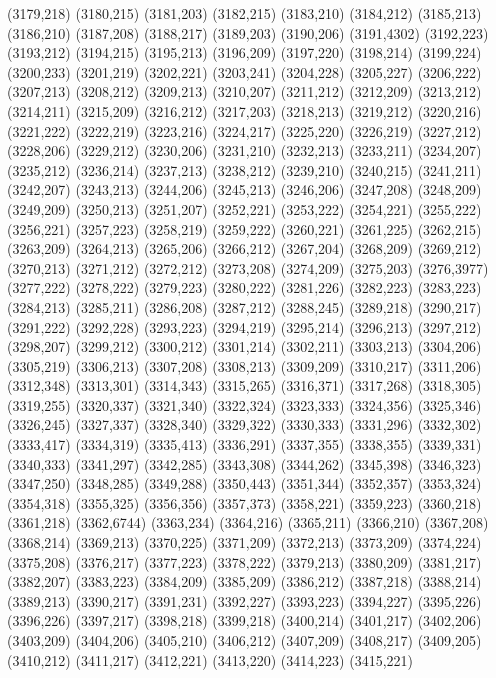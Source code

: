 (3179,218)
(3180,215)
(3181,203)
(3182,215)
(3183,210)
(3184,212)
(3185,213)
(3186,210)
(3187,208)
(3188,217)
(3189,203)
(3190,206)
(3191,4302)
(3192,223)
(3193,212)
(3194,215)
(3195,213)
(3196,209)
(3197,220)
(3198,214)
(3199,224)
(3200,233)
(3201,219)
(3202,221)
(3203,241)
(3204,228)
(3205,227)
(3206,222)
(3207,213)
(3208,212)
(3209,213)
(3210,207)
(3211,212)
(3212,209)
(3213,212)
(3214,211)
(3215,209)
(3216,212)
(3217,203)
(3218,213)
(3219,212)
(3220,216)
(3221,222)
(3222,219)
(3223,216)
(3224,217)
(3225,220)
(3226,219)
(3227,212)
(3228,206)
(3229,212)
(3230,206)
(3231,210)
(3232,213)
(3233,211)
(3234,207)
(3235,212)
(3236,214)
(3237,213)
(3238,212)
(3239,210)
(3240,215)
(3241,211)
(3242,207)
(3243,213)
(3244,206)
(3245,213)
(3246,206)
(3247,208)
(3248,209)
(3249,209)
(3250,213)
(3251,207)
(3252,221)
(3253,222)
(3254,221)
(3255,222)
(3256,221)
(3257,223)
(3258,219)
(3259,222)
(3260,221)
(3261,225)
(3262,215)
(3263,209)
(3264,213)
(3265,206)
(3266,212)
(3267,204)
(3268,209)
(3269,212)
(3270,213)
(3271,212)
(3272,212)
(3273,208)
(3274,209)
(3275,203)
(3276,3977)
(3277,222)
(3278,222)
(3279,223)
(3280,222)
(3281,226)
(3282,223)
(3283,223)
(3284,213)
(3285,211)
(3286,208)
(3287,212)
(3288,245)
(3289,218)
(3290,217)
(3291,222)
(3292,228)
(3293,223)
(3294,219)
(3295,214)
(3296,213)
(3297,212)
(3298,207)
(3299,212)
(3300,212)
(3301,214)
(3302,211)
(3303,213)
(3304,206)
(3305,219)
(3306,213)
(3307,208)
(3308,213)
(3309,209)
(3310,217)
(3311,206)
(3312,348)
(3313,301)
(3314,343)
(3315,265)
(3316,371)
(3317,268)
(3318,305)
(3319,255)
(3320,337)
(3321,340)
(3322,324)
(3323,333)
(3324,356)
(3325,346)
(3326,245)
(3327,337)
(3328,340)
(3329,322)
(3330,333)
(3331,296)
(3332,302)
(3333,417)
(3334,319)
(3335,413)
(3336,291)
(3337,355)
(3338,355)
(3339,331)
(3340,333)
(3341,297)
(3342,285)
(3343,308)
(3344,262)
(3345,398)
(3346,323)
(3347,250)
(3348,285)
(3349,288)
(3350,443)
(3351,344)
(3352,357)
(3353,324)
(3354,318)
(3355,325)
(3356,356)
(3357,373)
(3358,221)
(3359,223)
(3360,218)
(3361,218)
(3362,6744)
(3363,234)
(3364,216)
(3365,211)
(3366,210)
(3367,208)
(3368,214)
(3369,213)
(3370,225)
(3371,209)
(3372,213)
(3373,209)
(3374,224)
(3375,208)
(3376,217)
(3377,223)
(3378,222)
(3379,213)
(3380,209)
(3381,217)
(3382,207)
(3383,223)
(3384,209)
(3385,209)
(3386,212)
(3387,218)
(3388,214)
(3389,213)
(3390,217)
(3391,231)
(3392,227)
(3393,223)
(3394,227)
(3395,226)
(3396,226)
(3397,217)
(3398,218)
(3399,218)
(3400,214)
(3401,217)
(3402,206)
(3403,209)
(3404,206)
(3405,210)
(3406,212)
(3407,209)
(3408,217)
(3409,205)
(3410,212)
(3411,217)
(3412,221)
(3413,220)
(3414,223)
(3415,221)
